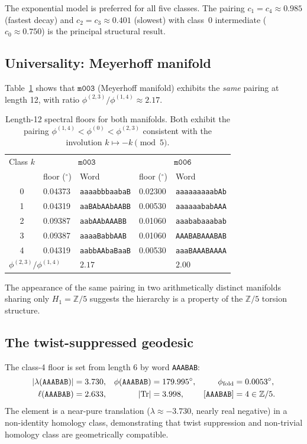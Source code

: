 \documentclass[11pt,a4paper]{article}
\theoremstyle{remark}
\newcommand{\mfld}[1]{\texttt{#1}}
\newcommand{\word}[1]{\texttt{#1}}
\newcommand{\degr}{^{\circ}}
\newcommand{\Zfive}{\mathbb{Z}/5}
\begin{document}
The exponential model is preferred for all five classes.
The pairing $c_1=c_4\approx 0.985$ (fastest decay) and
$c_2=c_3\approx 0.401$ (slowest) with class~0 intermediate
($c_0\approx 0.750$) is the principal structural result.

\subsection{Universality: Meyerhoff manifold}

Table~\ref{tab:both_L12} shows that $\mfld{m003}$
(Meyerhoff manifold) exhibits the \emph{same} pairing at length 12,
with ratio $\phi^{(2,3)}/\phi^{(1,4)}\approx 2.17$.

\begin{table}[htbp]
\centering
\caption{Length-12 spectral floors for both manifolds.
Both exhibit the pairing $\phi^{(1,4)}<\phi^{(0)}<\phi^{(2,3)}$
consistent with the involution $k\mapsto{-k}\pmod 5$.}
\label{tab:both_L12}
\begin{tabular}{cllll}
\toprule
Class $k$ & \multicolumn{2}{c}{$\mfld{m003}$}
           & \multicolumn{2}{c}{$\mfld{m006}$} \\
           & floor ($\degr$) & Word & floor ($\degr$) & Word \\
\midrule
0 & 0.04373 & \word{aaaabbbaabaB} & 0.02300 & \word{aaaaaaaaabAb} \\
1 & 0.04319 & \word{aaBAbAAbAABB} & 0.00530 & \word{aaaaaababAAA} \\
2 & 0.09387 & \word{aabAAbAAABB}  & 0.01060 & \word{aaababaaabab} \\
3 & 0.09387 & \word{aaaaBabbAAB}  & 0.01060 & \word{AAABABAAABAB} \\
4 & 0.04319 & \word{aabbAAbaBaaB} & 0.00530 & \word{aaaBAAABAAAA} \\
\midrule
\multicolumn{2}{l}{$\phi^{(2,3)}/\phi^{(1,4)}$} & $2.17$ & & $2.00$ \\
\bottomrule
\end{tabular}
\end{table}

The appearance of the same pairing in two arithmetically distinct
manifolds sharing only $H_1=\Zfive$ suggests the hierarchy is
a property of the $\Zfive$ torsion structure.

\subsection{The twist-suppressed geodesic}

The class-4 floor is set from length 6 by word \word{AAABAB}:
\begin{align*}
|\lambda(\word{AAABAB})| &= 3.730, &
\phi(\word{AAABAB}) &= 179.995\degr, &
\phi_{\rm fold} &= 0.0053\degr, \\
\ell(\word{AAABAB}) &= 2.633, &
|\mathrm{Tr}| &= 3.998,  &
[\word{AAABAB}] &= 4 \in \Zfive.
\end{align*}
The element is a near-pure translation ($\lambda\approx -3.730$,
nearly real negative) in a non-identity homology class,
demonstrating that twist suppression and non-trivial homology
class are geometrically compatible.
\end{document}
